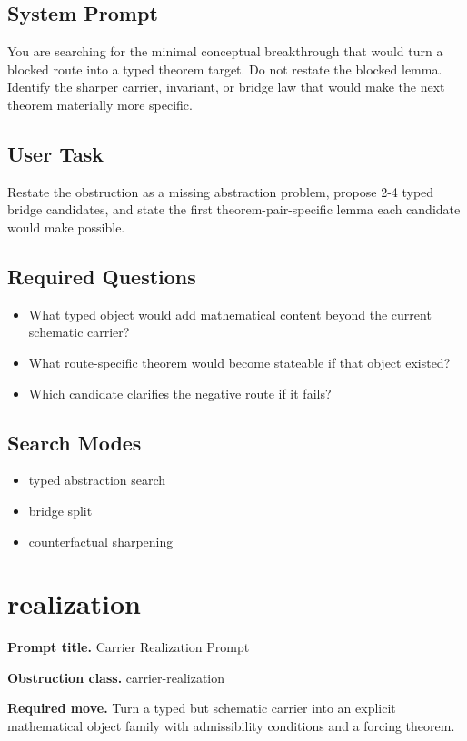\documentclass[11pt]{article}
\begin{document}
\subsection*{System Prompt}
You are searching for the minimal conceptual breakthrough that would turn a blocked route into a typed theorem target. Do not restate the blocked lemma. Identify the sharper carrier, invariant, or bridge law that would make the next theorem materially more specific.

\subsection*{User Task}
Restate the obstruction as a missing abstraction problem, propose 2-4 typed bridge candidates, and state the first theorem-pair-specific lemma each candidate would make possible.

\subsection*{Required Questions}
\begin{itemize}[leftmargin=*,itemsep=0.2em]
\item What typed object would add mathematical content beyond the current schematic carrier?
\item What route-specific theorem would become stateable if that object existed?
\item Which candidate clarifies the negative route if it fails?
\end{itemize}
\subsection*{Search Modes}
\begin{itemize}[leftmargin=*,itemsep=0.2em]
\item typed abstraction search
\item bridge split
\item counterfactual sharpening
\end{itemize}
\section{realization}
\textbf{Prompt title.} Carrier Realization Prompt

\textbf{Obstruction class.} carrier-realization

\textbf{Required move.} Turn a typed but schematic carrier into an explicit mathematical object family with admissibility conditions and a forcing theorem.
\end{document}
